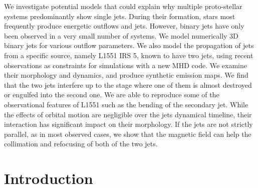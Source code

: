 \documentclass{aa}
\begin{document}
  \abstract
   {}
   { We investigate potential models that could explain why multiple
		proto-stellar systems 
		predominantly show single jets.
		During their formation, stars most frequently produce energetic outflows
		and jets.
		However, binary jets have only been observed in a very small number of
		systems.}
   { We model numerically 3D binary jets for various outflow parameters. 
		We also model the propagation of jets from a specific source, namely L1551
		IRS
		5, known to have two jets, 
		using recent observations as constraints for simulations with a new MHD
		code. 
		We examine their morphology and dynamics, and produce synthetic emission
		maps.  }
   { We find that the two jets interfere up to the stage where
		one of them is almost destroyed or engulfed into the second one.
		We are able to reproduce some of the observational features of L1551
		such as the bending of the secondary jet.  }
   { %
			While the effects of orbital motion are negligible over the jets
			dynamical timeline, 
			their interaction has significant impact on their morphology.
			If the jets are not strictly parallel, as in most observed cases, we
			show that
			the magnetic field can help the collimation and refocusing of both of
			the two jets.  }


   \maketitle
%

\section{Introduction}


	
\end{document}
